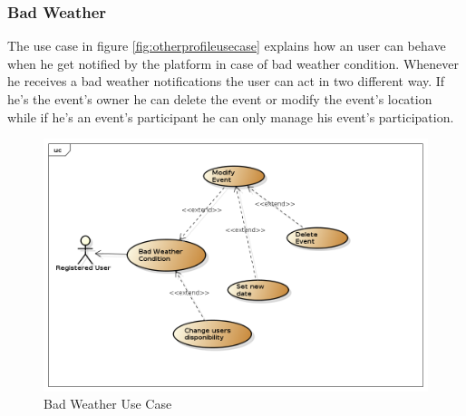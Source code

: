 \subsubsection{Bad Weather}
The use case in figure \ref{fig:otherprofileusecase} explains how an user can behave when he get notified by the platform in case of bad weather condition. Whenever he receives a bad weather notifications the user can act in two different way. If he's the event's owner he can delete the event or modify the event's location while if he's an event's participant he can only manage his event's participation.
 \begin{center}
 \begin{figure}[H]
    \includegraphics[width=1.1\textwidth]{../UMLDiagram/use_case/BadWeather/BadWeather.png}
    \caption{Bad Weather Use Case}
     \label{fig:badweatherusecase}
     \end{figure}
   \end{center}  

